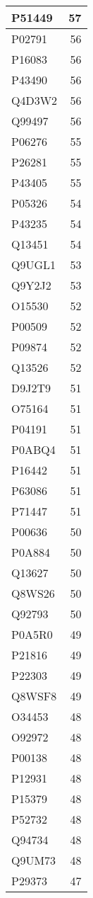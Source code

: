 \documentclass[
]{book}
\theoremstyle{definition}
\theoremstyle{definition}
\theoremstyle{definition}
\theoremstyle{definition}
\theoremstyle{remark}
\begin{document}
\begin{table}
\begin{tabular}{l|r}
\hline
P51449 & 57\\
\hline
P02791 & 56\\
\hline
P16083 & 56\\
\hline
P43490 & 56\\
\hline
Q4D3W2 & 56\\
\hline
Q99497 & 56\\
\hline
P06276 & 55\\
\hline
P26281 & 55\\
\hline
P43405 & 55\\
\hline
P05326 & 54\\
\hline
P43235 & 54\\
\hline
Q13451 & 54\\
\hline
Q9UGL1 & 53\\
\hline
Q9Y2J2 & 53\\
\hline
O15530 & 52\\
\hline
P00509 & 52\\
\hline
P09874 & 52\\
\hline
Q13526 & 52\\
\hline
D9J2T9 & 51\\
\hline
O75164 & 51\\
\hline
P04191 & 51\\
\hline
P0ABQ4 & 51\\
\hline
P16442 & 51\\
\hline
P63086 & 51\\
\hline
P71447 & 51\\
\hline
P00636 & 50\\
\hline
P0A884 & 50\\
\hline
Q13627 & 50\\
\hline
Q8WS26 & 50\\
\hline
Q92793 & 50\\
\hline
P0A5R0 & 49\\
\hline
P21816 & 49\\
\hline
P22303 & 49\\
\hline
Q8WSF8 & 49\\
\hline
O34453 & 48\\
\hline
O92972 & 48\\
\hline
P00138 & 48\\
\hline
P12931 & 48\\
\hline
P15379 & 48\\
\hline
P52732 & 48\\
\hline
Q94734 & 48\\
\hline
Q9UM73 & 48\\
\hline
P29373 & 47\\

\end{tabular}
\end{table}
\end{document}
